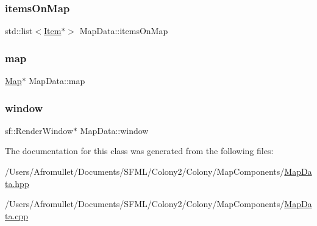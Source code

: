 \mbox{\label{class_map_data_a8a6af49f0a89008e9fc99d3bae2d6796}} 
\subsubsection{\texorpdfstring{items\+On\+Map}{itemsOnMap}}
{\footnotesize\ttfamily std\+::list$<$\mbox{\hyperlink{class_item}{Item}}$\ast$$>$ Map\+Data\+::items\+On\+Map}

\mbox{\label{class_map_data_af00f20d0b16d8d5e9ea700ba40a20bf8}} 
\subsubsection{\texorpdfstring{map}{map}}
{\footnotesize\ttfamily \mbox{\hyperlink{class_map}{Map}}$\ast$ Map\+Data\+::map}

\mbox{\label{class_map_data_af927873e328d1fb6a4b5c0cf145808db}} 
\subsubsection{\texorpdfstring{window}{window}}
{\footnotesize\ttfamily sf\+::\+Render\+Window$\ast$ Map\+Data\+::window}



The documentation for this class was generated from the following files\+:\begin{DoxyCompactItemize}
\item 
/\+Users/\+Afromullet/\+Documents/\+S\+F\+M\+L/\+Colony2/\+Colony/\+Map\+Components/\mbox{\hyperlink{_map_data_8hpp}{Map\+Data.\+hpp}}\item 
/\+Users/\+Afromullet/\+Documents/\+S\+F\+M\+L/\+Colony2/\+Colony/\+Map\+Components/\mbox{\hyperlink{_map_data_8cpp}{Map\+Data.\+cpp}}\end{DoxyCompactItemize}
